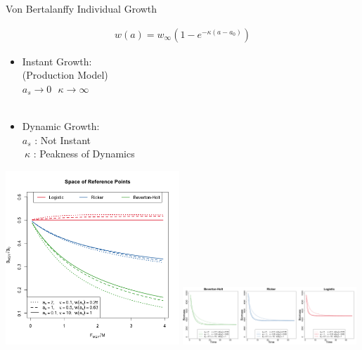 \documentclass[ xcolor = pdftex, dvipsnames, table ]{beamer}
\begin{document}
%
\begin{frame}{\color{red}Von Bertalanffy Individual Growth}
%
\begin{minipage}[h!]{0.47\textwidth}
        \vspace{-1cm}
        \begin{align*}
        w(a) = w_\infty(1-e^{-\kappa (a-a_0)}) %
        \end{align*}
        \begin{itemize}
        \item Instant Growth: \\(Production Model)\\
        $a_s \rightarrow 0 ~~~ \kappa \rightarrow \infty$\\$~$\\
        \item Dynamic Growth:\\
        $a_s$ : Not Instant\\
        $~\kappa$ : Peakness of Dynamics
        \end{itemize}
\end{minipage}
\begin{minipage}[h!]{0.51\textwidth}
	\includegraphics[width=0.49\textwidth]{../../ddBias/rpTriptic.png}
	\includegraphics[width=0.49\textwidth]{../../ddBias/growthTriptic.png}
\end{minipage}
\end{frame}
\end{document}
